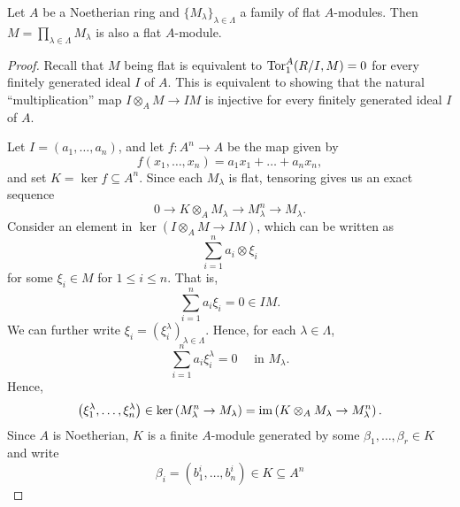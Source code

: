 \begin{theorem}
    Let $A$ be a Noetherian ring and $\{M_\lambda\}_{\lambda\in\Lambda}$ a family of flat $A$-modules. Then $\displaystyle M = \prod_{\lambda\in\Lambda} M_\lambda$ is also a flat $A$-module.
\end{theorem}
\begin{proof}
    Recall that $M$ being flat is equivalent to $\operatorname{Tor}^A_1(R/I, M) = 0$ for every finitely generated ideal $I$ of $A$. This is equivalent to showing that the natural ``multiplication'' map $I\otimes_A M\to IM$ is injective for every finitely generated ideal $I$ of $A$.

    Let $I = (a_1,\dots,a_n)$, and let $f\colon A^n\to A$ be the map given by 
    \begin{equation*}
        f(x_1,\dots,x_n) = a_1x_1 + \dots + a_nx_n,
    \end{equation*}
    and set $K = \ker f\subseteq A^n$. Since each $M_\lambda$ is flat, tensoring gives us an exact sequence 
    \begin{equation*}
        0\to K\otimes_A M_\lambda\to M_\lambda^n\to M_\lambda.
    \end{equation*}
    Consider an element in $\ker\left(I\otimes_A M\to IM\right)$, which can be written as 
    \begin{equation*}
        \sum_{i = 1}^n a_i\otimes\xi_i
    \end{equation*}
    for some $\xi_i\in M$ for $1\le i\le n$. That is, 
    \begin{equation*}
        \sum_{i = 1}^n a_i\xi_i = 0\in IM.
    \end{equation*}
    We can further write $\xi_i = \left(\xi_i^\lambda\right)_{\lambda\in\Lambda}$. Hence, for each $\lambda\in\Lambda$, 
    \begin{equation*}
        \sum_{i = 1}^n a_i\xi_i^\lambda = 0\quad\text{ in }M_\lambda.
    \end{equation*}
    Hence, 
    \begin{equation*}
        \left(\xi_1^\lambda,\dots,\xi_n^\lambda\right)\in\ker\left(M_\lambda^n\to M_\lambda\right) = \operatorname{im}\left(K\otimes_A M_\lambda\to M_\lambda^n\right).
    \end{equation*}
    Since $A$ is Noetherian, $K$ is a finite $A$-module generated by some $\beta_1,\dots,\beta_r\in K$ and write 
    \begin{equation*}
        \beta_i = \left(b_1^i,\dots,b_n^i\right)\in K\subseteq A^n
    \end{equation*}

\end{proof}
